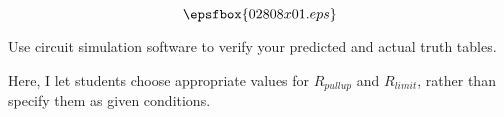 

$$\epsfbox{02808x01.eps}$$

\vfil \eject






Use circuit simulation software to verify your predicted and actual truth tables.







Here, I let students choose appropriate values for $R_{pullup}$ and $R_{limit}$, rather than specify them as given conditions.




